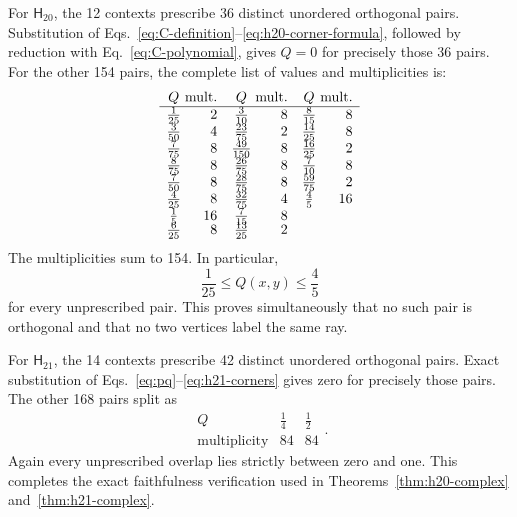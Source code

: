 \documentclass[12pt,a4paper]{article}
\theoremstyle{definition}
\theoremstyle{remark}
\newcommand{\Htwenty}{\mathsf H_{20}}
\newcommand{\Htwentyone}{\mathsf H_{21}}
\begin{document}
For $\Htwenty$, the 12 contexts prescribe 36 distinct unordered
orthogonal pairs.  Substitution of
Eqs.~\eqref{eq:C-definition}--\eqref{eq:h20-corner-formula}, followed by
reduction with Eq.~\eqref{eq:C-polynomial}, gives $Q=0$ for precisely
those 36 pairs.  For the other 154 pairs, the complete list of values
and multiplicities is:
\begin{equation}
\begin{array}{c@{\;}r@{\quad}c@{\;}r@{\quad}c@{\;}r}
 Q&\text{mult.}&Q&\text{mult.}&Q&\text{mult.}\\ \hline
 \frac1{25}&2&\frac3{10}&8&\frac8{15}&8\\
 \frac3{50}&4&\frac{23}{75}&2&\frac{14}{25}&8\\
 \frac7{75}&8&\frac{49}{150}&8&\frac{16}{25}&2\\
 \frac8{75}&8&\frac{26}{75}&8&\frac7{10}&8\\
 \frac7{50}&8&\frac{28}{75}&8&\frac{59}{75}&2\\
 \frac4{25}&8&\frac{32}{75}&4&\frac45&16\\
 \frac15&16&\frac7{15}&8&&\\[-2pt]
 \frac6{25}&8&\frac{13}{25}&2&&
\end{array}
\label{eq:H20-Q-table}
\end{equation}
The multiplicities sum to 154.  In particular,
\begin{equation}
 \frac1{25}\le Q(x,y)\le\frac45
 \label{eq:H20-Q-bounds}
\end{equation}
for every unprescribed pair.  This proves simultaneously that no such
pair is orthogonal and that no two vertices label the same ray.

For $\Htwentyone$, the 14 contexts prescribe 42 distinct unordered
orthogonal pairs.  Exact substitution of
Eqs.~\eqref{eq:pq}--\eqref{eq:h21-corners} gives zero for
precisely those pairs.  The other 168 pairs split as
\begin{equation}
 \begin{array}{c|cc}
 Q&\frac14&\frac12\\ \hline
 \text{multiplicity}&84&84
 \end{array}.
 \label{eq:H21-Q-table}
\end{equation}
Again every unprescribed overlap lies strictly between zero and one.
This completes the exact faithfulness verification used in
Theorems~\ref{thm:h20-complex} and~\ref{thm:h21-complex}.
\end{document}
